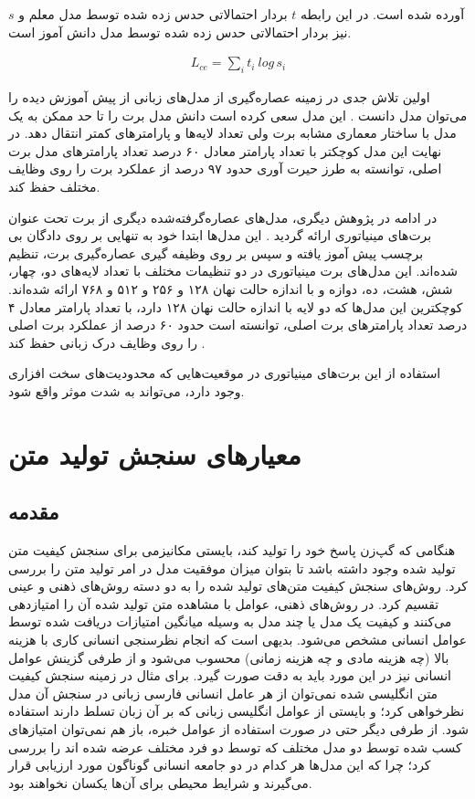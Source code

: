 آورده شده است. در این رابطه $t$ بردار احتمالاتی حدس زده شده توسط مدل معلم و $s$ نیز بردار احتمالاتی حدس زده شده توسط مدل دانش آموز است.

\begin{align} \label{eq:cross_entropy}
L_{ce} = \sum_{i}^{} t_i\:log\,s_i
\end{align}

اولین تلاش جدی در زمینه عصاره‌گیری از مدل‌های زبانی از پیش آموزش دیده را می‌توان مدل 
دانست
\cite{sanh2019distilbert}.
این مدل سعی کرده است دانش مدل برت را 
تا حد ممکن به یک مدل با ساختار معماری مشابه برت ولی تعداد  لایه‌ها و پارامتر‌های کمتر انتقال دهد. در نهایت این مدل کوچکتر با تعداد پارامتر معادل ۶۰ درصد تعداد پارامتر‌های مدل برت اصلی،
توانسته به طرز حیرت آوری حدود ۹۷ درصد از عملکرد برت را روی وظایف مختلف حفظ کند. 

در ادامه در پژوهش دیگری، مدل‌های عصاره‌گرفته‌شده دیگری از برت تحت عنوان برت‌های مینیاتوری ارائه گردید
\cite{turc2019well}.
این مدل‌ها ابتدا خود به تنهایی بر روی دادگان بی برچسب پیش آموز یافته و سپس بر روی وظیفه گیری عصاره‌گیری برت، تنظیم شده‌اند. این مدل‌های برت مینیاتوری در دو تنظیمات مختلف 
با تعداد لایه‌های دو، چهار، شش، هشت، ده، دوازه و با اندازه حالت نهان ۱۲۸ و ۲۵۶ و ۵۱۲ و ۷۶۸ ارائه شده‌اند. کوچکترین این مدل‌ها که دو لایه با اندازه حالت نهان ۱۲۸ دارد، با تعداد پارامتر معادل ۴ درصد تعداد پارامترهای برت اصلی، توانسته است حدود ۶۰ درصد از عملکرد برت‌ اصلی را روی وظایف درک زبانی حفظ کند
\cite{turc2019well}.

استفاده از این برت‌های مینیاتوری در موقعیت‌هایی که محدودیت‌های سخت افزاری وجود دارد، می‌تواند به شدت موثر واقع شود.

\section{معیارهای سنجش تولید متن}

\subsection{مقدمه}
هنگامی که گپ‌زن پاسخ‌ خود را تولید کند، بایستی مکانیزمی برای سنجش کیفیت متن تولید شده وجود داشته باشد تا بتوان میزان موفقیت مدل در امر تولید متن را بررسی کرد. روش‌های سنجش کیفیت متن‌های تولید شده را به دو دسته‌ روش‌های ذهنی و عینی تقسیم کرد. در روش‌های ذهنی، عوامل با مشاهده متن تولید شده آن را امتیازدهی می‌کنند و کیفیت یک مدل یا چند مدل به وسیله میانگین امتیازات دریافت شده توسط عوامل انسانی مشخص می‌شود. بدیهی است که انجام نظرسنجی انسانی کاری با هزینه بالا (چه هزینه مادی و چه هزینه زمانی) محسوب می‌شود و از طرفی گزینش عوامل انسانی نیز در این مورد باید به دقت صورت گیرد. برای مثال در زمینه سنجش کیفیت متن انگلیسی شده نمی‌توان از هر عامل انسانی فارسی زبانی در سنجش آن مدل نظرخواهی کرد؛ و بایستی از عوامل انگلیسی زبانی که بر آن زبان تسلط دارند استفاده شود. از طرفی دیگر حتی در صورت استفاده از عوامل خبره، باز هم نمی‌توان امتیازهای کسب شده توسط دو مدل مختلف که توسط دو فرد مختلف عرضه شده اند را بررسی کرد؛ چرا که این مدل‌ها هر کدام در دو جامعه انسانی گوناگون مورد ارزیابی قرار می‌‌گیرند و شرایط محیطی برای آن‌ها یکسان نخواهند بود. 

